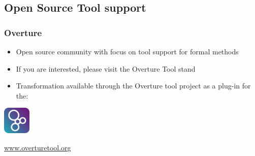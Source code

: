\subsection{Open Source Tool support}
%
%
\frame
{
  \frametitle{Overture}

  \begin{itemize}
  		\item Open source community with focus on tool support for formal methods\pause
		\item If you are interested, please visit the Overture Tool stand\pause
  		\item Transformation available through the Overture tool project as a plug-in for the:
  \end{itemize}

\pause
 \begin{center} 
	
	\includegraphics[width=50px]{images/logo.jpg}%

  \LARGE {}

\vspace{1cm}
	\href{www.overturetool.org}{www.overturetool.org}
  

\end{center}
}

